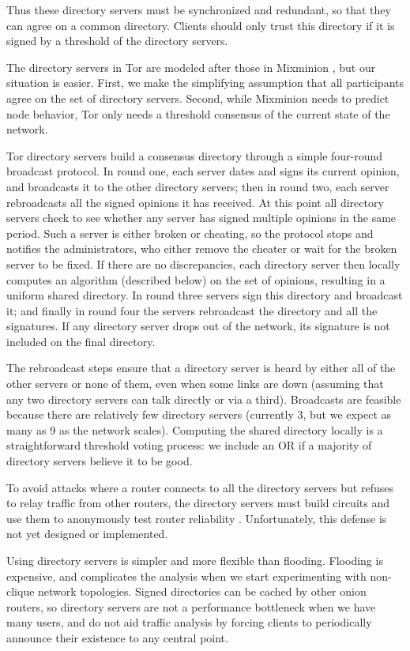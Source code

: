 \documentclass[times,10pt,twocolumn]{article}
\begin{document}
Thus these directory servers must be synchronized and redundant, so
that they can agree on a common directory.  Clients should only trust
this directory if it is signed by a threshold of the directory
servers.

The directory servers in Tor are modeled after those in Mixminion
\cite{minion-design}, but our situation is easier. First, we make the
simplifying assumption that all participants agree on the set of
directory servers. Second, while Mixminion needs to predict node
behavior, Tor only needs a threshold consensus of the current
state of the network.

Tor directory servers build a consensus directory through a simple
four-round broadcast protocol.  In round one, each server dates and
signs its current opinion, and broadcasts it to the other directory
servers; then in round two, each server rebroadcasts all the signed
opinions it has received.  At this point all directory servers check
to see whether any server has signed multiple opinions in the same
period. Such a server is either broken or cheating, so the protocol
stops and notifies the administrators, who either remove the cheater
or wait for the broken server to be fixed.  If there are no
discrepancies, each directory server then locally computes an algorithm
(described below)
on the set of opinions, resulting in a uniform shared directory. In
round three servers sign this directory and broadcast it; and finally
in round four the servers rebroadcast the directory and all the
signatures.  If any directory server drops out of the network, its
signature is not included on the final directory.

The rebroadcast steps ensure that a directory server is heard by
either all of the other servers or none of them, even when some links
are down (assuming that any two directory servers can talk directly or
via a third). Broadcasts are feasible because there are relatively few
directory servers (currently 3, but we expect as many as 9 as the network
scales). Computing the shared directory locally is a straightforward
threshold voting process: we include an OR if a majority of directory
servers believe it to be good.

To avoid attacks where a router connects to all the directory servers
but refuses to relay traffic from other routers, the directory servers
must build circuits and use them to anonymously test router reliability
\cite{mix-acc}. Unfortunately, this defense is not yet designed or
implemented.

Using directory servers is simpler and more flexible than flooding.
Flooding is expensive, and complicates the analysis when we
start experimenting with non-clique network topologies. Signed
directories can be cached by other
onion routers,
so directory servers are not a performance
bottleneck when we have many users, and do not aid traffic analysis by
forcing clients to periodically announce their existence to any
central point.
\end{document}
